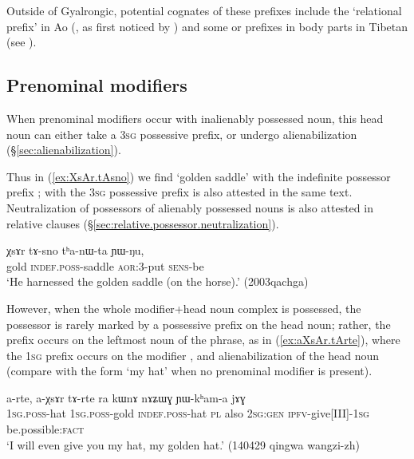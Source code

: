 Outside of Gyalrongic, potential cognates of these prefixes include the `relational prefix'  in Ao (\citealt[84--85]{coupe07mongsen}, as first noticed by \citealt[141--142]{wolfenden29outlines}) and some  or  prefixes in body parts in Tibetan (see \citealt{jacques14snom}).
 
\subsection{Prenominal modifiers} \label{sec:possessive.prefixes.prenominal}
When prenominal modifiers occur with inalienably possessed noun, this head noun can either take a \textsc{3sg} possessive prefix, or undergo alienabilization (§\ref{sec:alienabilization}). 

Thus in (\ref{ex:XsAr.tAsno}) we find  `golden saddle' with the indefinite possessor prefix ;  with the \textsc{3sg} possessive prefix is also attested in the same text. Neutralization of possessors of alienably possessed nouns is also attested in relative clauses (§\ref{sec:relative.possessor.neutralization}).

\begin{exe}
\ex \label{ex:XsAr.tAsno}
\gll χsɤr tɤ-sno tʰa-nɯ-ta ɲɯ-ŋu, \\
gold \textsc{indef}.\textsc{poss}-saddle \textsc{aor}:3\flobv{}-put \textsc{sens}-be \\
\glt `He harnessed the golden saddle (on the horse).' (2003qachga)
\end{exe}

However, when the whole modifier+head noun complex is possessed, the possessor is rarely marked by a possessive prefix on the head noun; rather, the prefix occurs on the leftmost noun of the phrase, as in (\ref{ex:aXsAr.tArte}), where the \textsc{1sg} prefix  occurs on the modifier , and alienabilization of the head noun  (compare with the form  `my hat' when no prenominal modifier is present). %

\begin{exe}
\ex \label{ex:aXsAr.tArte}
\gll a-rte, a-χsɤr tɤ-rte ra kɯnɤ nɤʑɯɣ ɲɯ-kʰam-a jɤɣ \\
\textsc{1sg}.\textsc{poss}-hat \textsc{1sg}.\textsc{poss}-gold \textsc{indef}.\textsc{poss}-hat \textsc{pl} also \textsc{2sg}:\textsc{gen} \textsc{ipfv}-give[III]-\textsc{1sg} be.possible:\textsc{fact} \\
\glt `I will even give you my hat, my golden hat.' (140429 qingwa wangzi-zh)
\end{exe}


